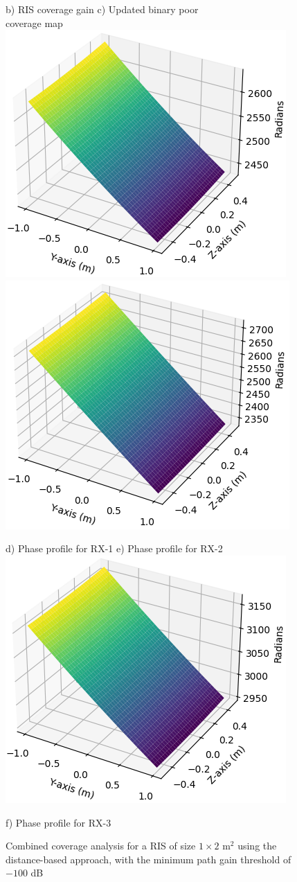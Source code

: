 \documentclass{IEEEoj}
\begin{document}
\begin{figure}
	\hspace{10pt} b) RIS coverage gain \hspace{30pt} c) Updated binary poor \\ \hspace{140pt} coverage map
	\includegraphics[width=0.48\linewidth]{Sim_Results/pp_-100dB_distance_RX1.png}
	\hfill
	\includegraphics[width=0.48\linewidth]{Sim_Results/pp_-100dB_distance_RX2.png}

	\hspace{10pt} d) Phase profile for RX-1 \hspace{15pt} e) Phase profile for RX-2 \\[5pt]
	
	\includegraphics[width=0.49\linewidth]{Sim_Results/pp_-100dB_distance_RX3.png}
	
	f) Phase profile for RX-3
	
	\caption{Combined coverage analysis for a RIS of size $1 \times 2$ m$^2$ using the distance-based approach, with the minimum path gain threshold of $-100$ dB}
	\label{comb_cov_distance}
\end{figure}
\end{document}
